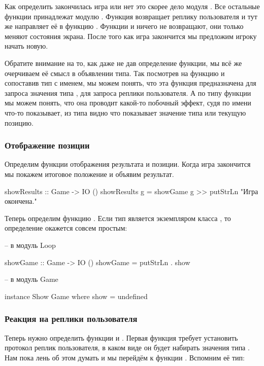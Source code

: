 Как определить закончилась игра или нет это скорее дело
модуля . Все остальные функции принадлежат модулю .
Функция  возвращает реплику пользователя и 
тут же направляет её в функцию . 
Функции  и  ничего не возвращают,
они только меняют состояния экрана. После того как игра
закончится мы предложим игроку начать новую.

Обратите внимание на то, как даже не дав определение функции,
мы всё же очерчиваем её смысл в объявлении типа.
Так посмотрев на функцию  и сопоставив тип
с именем, мы можем понять, что эта функция предназначена
для запроса значения типа , для запроса реплики 
пользователя. А по типу функции  мы можем
понять, что она проводит какой-то побочный эффект, 
судя по имени что-то показывает, из типа видно что показывает
значение типа  или текущую позицию.

\subsubsection{Отображение позиции}

Определим функции отображения результата и позиции. Когда игра
закончится мы покажем итоговое положение и объявим результат.

\begin{code}
showResults :: Game -> IO ()
showResults g = showGame g >> putStrLn "Игра окончена."
\end{code}

Теперь определим функцию . Если тип
 является экземпляром класса , то
определение окажется совсем простым:

\begin{code}
-- в модуль Loop

showGame :: Game -> IO ()
showGame = putStrLn . show 

-- в модуль Game

instance Show Game where
    show = undefined
\end{code}

\subsubsection{Реакция на реплики пользователя}

Теперь нужно определить функции  и 
. Первая функция требует установить 
протокол реплик пользователя, в каком виде он будет
набирать значения типа . Нам пока лень об этом
думать и мы перейдём к функции .
Вспомним её тип:

